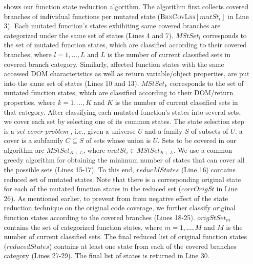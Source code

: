 shows our function state reduction algorithm. The algorithm first collects covered branches of individual functions per mutated state (\textsc{BrnCovLns}$[mutSt_i]$ in Line 3). Each mutated function's states exhibiting same covered branches are categorized under the same set of states (Lines 4 and 7). $MStSet_{l}$ corresponds to the set of mutated function states, which are classified according to their covered branches, where $l={1,...,L}$ and $L$ is the number of current classified sets in covered branch category. Similarly, affected function states with the same accessed DOM characteristics as well as return variable/object properties, are put into the same set of states (Lines 10 and 13). $MStSet_{k}$ corresponds to the set of mutated function states, which are classified according to their DOM/return properties, where $k={1,...,K}$ and $K$ is the number of current classified sets in that category.  After classifying each mutated function's states into several sets, we cover each set by selecting one of its common states.
The state selection step is a \emph{set cover problem} \cite{Cormen:2001}, i.e., given a universe $U$ and a family $S$ of subsets of $U$, a cover is a subfamily $C \subseteq S$ of sets whose union is $U$.
Sets to be covered in our algorithm are $MStSet_{K+L}$, where $mutSt_i \in MStSet_{K+L}$. We use a common greedy algorithm for obtaining the minimum number of states that can cover all the possible sets (Lines 15-17). To this end, $reducMStates$ (Line 16) contains reduced set of mutated states. 
Note that there is a corresponding original state for each of the mutated function states in the reduced set ($corrOrigSt$ in Line 26). 
As mentioned earlier, to prevent from from negative effect of the state reduction technique on the original code coverage, we further classify original function states according to the covered branches (Lines 18-25). $origStSet_m$ contains the set of categorized function states, where $m={1,...,M}$ and $M$ is the number of current classified sets. The final reduced list of original function states ($reducedStates$) contains at least one state from each of the covered branches category (Lines 27-29). The final list of states is returned in Line 30.  
%
%
